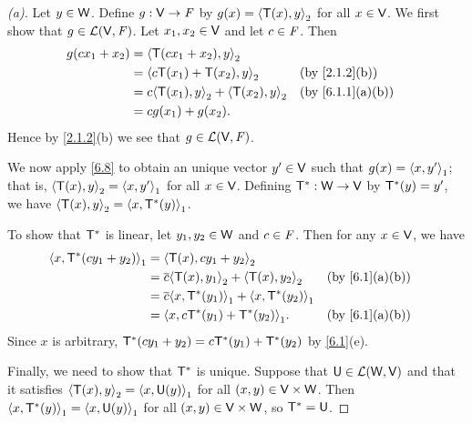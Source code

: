 \begin{proof}[(a)]
  Let \(y \in \mathsf{W}\).
  Define \(g : \mathsf{V} \to \mathit{F}\) by \(g(x) = \left\langle\mathsf{T}(x), y\right\rangle_2\) for all \(x \in \mathsf{V}\).
  We first show that \(g \in \mathcal{L}(\mathsf{V}, \mathit{F})\).
  Let \(x_1, x_2 \in \mathsf{V}\) and let \(c \in \mathit{F}\).
  Then
  \begin{align*}
    g(c x_1 + x_2) & = \inn{\T(c x_1 + x_2), y}_2                                     \\
                   & = \inn{c \T(x_1) + \T(x_2), y}_2            &  & \by{2.1.2}[b]   \\
                   & = c \inn{\T(x_1), y}_2 + \inn{\T(x_2), y}_2 &  & \by{6.1.1}[a,b] \\
                   & = c g(x_1) + g(x_2).
  \end{align*}
  Hence by \cref{2.1.2}(b) we see that \(g \in \mathcal{L}(\mathsf{V}, \mathit{F})\).

  We now apply \cref{6.8} to obtain an unique vector \(y' \in \mathsf{V}\) such that \(g(x) = \left\langle x, y'\right\rangle_1\);
  that is, \(\left\langle\mathsf{T}(x), y\right\rangle_2 = \left\langle x, y'\right\rangle_1\) for all \(x \in \mathsf{V}\).
  Defining \(\mathsf{T}^* : \mathsf{W} \to \mathsf{V}\) by \(\mathsf{T}^*(y) = y'\), we have \(\left\langle\mathsf{T}(x), y\right\rangle_2 = \left\langle x, \mathsf{T}^*(y)\right\rangle_1\).

  To show that \(\mathsf{T}^*\) is linear, let \(y_1, y_2 \in \mathsf{W}\) and \(c \in \mathit{F}\).
  Then for any \(x \in \mathsf{V}\),
  we have
  \begin{align*}
    \inn{x, \T^*(c y_1 + y_2)}_1 & = \inn{\T(x), c y_1 + y_2}_2                                              \\
                                 & = \conj{c} \inn{\T(x), y_1}_2 + \inn{\T(x), y_2}_2     &  & \by{6.1}[a,b] \\
                                 & = \conj{c} \inn{x, \T^*(y_1)}_1 + \inn{x, \T^*(y_2)}_1                    \\
                                 & = \inn{x, c \T^*(y_1) + \T^*(y_2)}_1.                  &  & \by{6.1}[a,b]
  \end{align*}
  Since \(x\) is arbitrary, \(\mathsf{T}^*(c y_1 + y_2) = c \mathsf{T}^*(y_1) + \mathsf{T}^*(y_2)\) by \cref{6.1}(e).

  Finally, we need to show that \(\mathsf{T}^*\) is unique. Suppose that \(\mathsf{U} \in \mathcal{L}(\mathsf{W}, \mathsf{V})\) and that it satisfies \(\left\langle\mathsf{T}(x), y\right\rangle_2 = \left\langle x, \mathsf{U}(y)\right\rangle_1\) for all \((x, y) \in \mathsf{V} \times \mathsf{W}\).
  Then \(\left\langle x, \mathsf{T}^*(y)\right\rangle_1 = \left\langle x, \mathsf{U}(y)\right\rangle_1\) for all \((x, y) \in \mathsf{V} \times \mathsf{W}\), so \(\mathsf{T}^* = \mathsf{U}\).
\end{proof}

